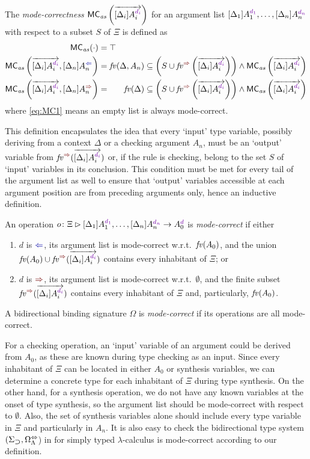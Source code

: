\begin{definition}\label{def:mode-correctness-args}
  The \emph{mode-correctness} $\MCas\left(\biargvec\right)$ for an argument list $\biargs$ with respect to a subset $S$ of $\Xi$ is defined as
  \begin{align}
    \label{eq:MC1} \MCas( \cdot ) & = \top \\
    \label{eq:MC3} \MCas\left(\biargvec, \chkbiarg[n]\right)
                                  & = \fv(\Delta, A_n) \subseteq \left( S \cup \synvar\left(\biargvec\right)\right) \land \MCas\left(\biargvec\right) \\
    \label{eq:MC2} \MCas\left(\biargvec, \synbiarg[n]\right) 
                                  & = \phantom{, A_n} \fv(\Delta) \subseteq \left( S \cup \synvar\left(\biargvec\right)\right) \land  \MCas\left(\biargvec\right)
  \end{align}
  where \eqref{eq:MC1} means an empty list is always mode-correct.
\end{definition}
This definition encapsulates the idea that every `input' type variable, possibly deriving from a context $\Delta$ or a checking argument $A_n$, must be an `output' variable from $\synvar(\biargvec)$ or, if the rule is checking, belong to the set $S$ of `input' variables in its conclusion.
This condition must be met for every tail of the argument list as well to ensure that `output' variables accessible at each argument position are from preceding arguments only, hence an inductive definition.
\begin{definition}\label{def:mode-correctness}
  An operation $\biop$ is \emph{mode-correct} if either
  \begin{enumerate}
    \item $d$ is $\chk$, its argument list is mode-correct w.r.t.\ $\mathit{fv}(A_0)$, and the union $\fv(A_0) \cup \synvar(\biargvec)$ contains every inhabitant of $\Xi$; or
    \item $d$ is $\syn$, its argument list is mode-correct w.r.t.\ $\emptyset$, and the finite subset $\synvar(\biargvec)$ contains every inhabitant of $\Xi$ and, particularly, $\mathit{fv}(A_0)$.
  \end{enumerate}
  A bidirectional binding signature $\Omega$ is \emph{mode-correct} if its operations are all mode-correct.
\end{definition}
For a checking operation, an `input' variable of an argument could be derived from $A_0$, as these are known during type checking as an input.
Since every inhabitant of $\Xi$ can be located in either $A_0$ or synthesis variables, we can determine a concrete type for each inhabitant of $\Xi$ during type synthesis.
On the other hand, for a synthesis operation, we do not have any known variables at the onset of type synthesis, so the argument list should be mode-correct with respect to $\emptyset$.
Also, the set of synthesis variables alone should include every type variable in $\Xi$ and particularly in $A_n$.
It is also easy to check the bidirectional type system $(\Sigma_{\mathbin{\bm{\supset}}}, \Omega^{\Leftrightarrow}_{\Lambda}$) in  for simply typed $\lambda$-calculus is mode-correct according to our definition.

